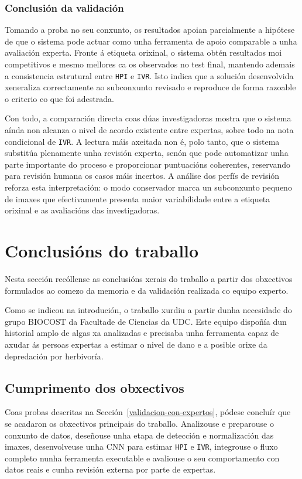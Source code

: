 \subsubsection{Conclusión da validación}
Tomando a proba no seu conxunto, os resultados apoian parcialmente a hipótese de que o sistema pode
actuar como unha ferramenta de apoio comparable a unha avaliación experta. Fronte
á etiqueta orixinal, o sistema obtén resultados moi competitivos e mesmo mellores ca os observados
no test final, mantendo ademais a consistencia estrutural entre \texttt{HPI} e \texttt{IVR}. Isto
indica que a solución desenvolvida xeneraliza correctamente ao subconxunto revisado e reproduce de
forma razoable o criterio co que foi adestrada.

Con todo, a comparación directa coas dúas investigadoras mostra que o sistema aínda non alcanza o
nivel de acordo existente entre expertas, sobre todo na nota condicional de \texttt{IVR}. A lectura
máis axeitada non é, polo tanto, que o sistema substitúa plenamente unha revisión experta, senón que
pode automatizar unha parte importante do proceso e proporcionar puntuacións coherentes, reservando
para revisión humana os casos máis incertos. A análise dos perfís de revisión reforza esta
interpretación: o modo conservador marca un subconxunto pequeno de imaxes que efectivamente presenta
maior variabilidade entre a etiqueta orixinal e as avaliacións das investigadoras.



\section{Conclusións do traballo}
Nesta sección recóllense as conclusións xerais do traballo a partir dos obxectivos formulados ao
comezo da memoria e da validación realizada co equipo experto.

Como se indicou na introdución, o traballo xurdiu a partir dunha necesidade do grupo BIOCOST da
Facultade de Ciencias da UDC. Este equipo dispoñía dun historial amplo de algas xa analizadas e
precisaba unha ferramenta capaz de axudar ás persoas expertas a estimar o nivel de dano e a posible
orixe da depredación por herbivoría.

\subsection{Cumprimento dos obxectivos}
Coas probas descritas na Sección~\ref{validacion-con-expertos}, pódese concluír que se acadaron os
obxectivos principais do traballo. Analizouse e preparouse o conxunto de datos, deseñouse unha etapa
de detección e normalización das imaxes, desenvolveuse unha CNN para estimar \texttt{HPI} e
\texttt{IVR}, integrouse o fluxo completo nunha ferramenta executable e avaliouse o seu
comportamento con datos reais e cunha revisión externa por parte de expertas.

